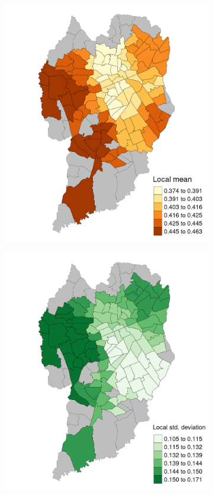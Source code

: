 \begin{figure}[!htbp]
    \centering\footnotesize
    \captionsetup{font=footnotesize}
    \caption{SPEEDING GW LOCAL MEAN AND STANDARD DEVIATION}
    \begin{subfigure}{0.5\textwidth}
        \includegraphics{fig/mean_map.png}
    \end{subfigure}%
    \begin{subfigure}{0.5\textwidth}
        \includegraphics{fig/sd_map.png}

\end{subfigure}
\end{figure}
